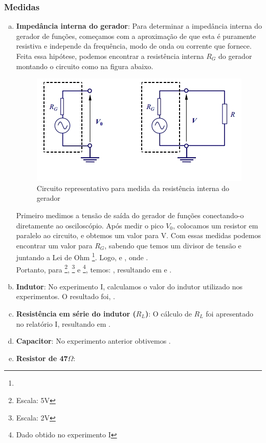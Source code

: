 \documentclass[10pt,letterpaper]{article}
\begin{document}
\subsubsection{Medidas}
\begin{enumerate}[(a)]
\item \label{itm:rger} \textbf{Impedância interna do gerador}: Para determinar a impedância interna do gerador de funções, começamos com a aproximação de que esta é puramente resistiva e independe da frequência, modo de onda ou corrente que fornece. Feita essa hipótese, podemos encontrar a resistência interna $R_G$ do gerador montando o circuito como na figura abaixo. 
  \begin{figure}[!htb]
    \centering
    \label{impger}
    \includegraphics[scale=0.5]{impger.jpg}
    \caption{Circuito representativo para medida da resistência interna do gerador}
  \end{figure}
Primeiro medimos a tensão de saída do gerador de funções conectando-o diretamente ao osciloscópio. Após medir o pico $V_0$, colocamos um resistor em paralelo ao circuito, e obtemos um valor para V. Com essas medidas podemos encontrar um valor para $R_G$, sabendo que temos um divisor de tensão e juntando a Lei de Ohm \footnote{}. Logo,  e , onde .\\ Portanto, para \footnote{Escala: 5V}, \footnote{Escala: 2V} e \footnote{Dado obtido no experimento I}, temos: , resultando em  e .
\item \label{itm:indutor} \textbf{Indutor}: No experimento I, calculamos o valor do indutor utilizado nos experimentos. O resultado foi, .
\item \label{itm:rindutor} \textbf{Resistência em série do indutor ($R_L$)}: O cálculo de $R_L$ foi apresentado no relatório I, resultando em .
\item \label{itm:capacitor} \textbf{Capacitor}: No experimento anterior obtivemos .
\item \label{itm:r47} \textbf{Resistor de 47$\Omega$}: 
\end{enumerate}
\end{document}

